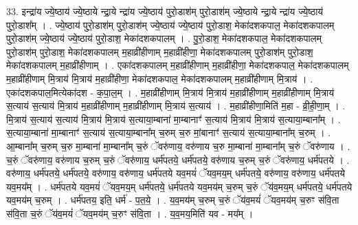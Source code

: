 \documentclass[17pt]{extarticle}
\begin{document}
33. इन्द्रा॑य ज्ये॒ष्ठाय॑ ज्ये॒ष्ठाये न्द्रा॒ये न्द्रा॑य ज्ये॒ष्ठाय॑ पुरो॒डाश॑म् पुरो॒डाश॑म् ज्ये॒ष्ठाये न्द्रा॒ये न्द्रा॑य ज्ये॒ष्ठाय॑ पुरो॒डाश᳚म् । . ज्ये॒ष्ठाय॑ पुरो॒डाश॑म् पुरो॒डाश॑म् ज्ये॒ष्ठाय॑ ज्ये॒ष्ठाय॑ पुरो॒डाश॒ मेका॑दशकपाल॒ मेका॑दशकपालम् पुरो॒डाश॑म् ज्ये॒ष्ठाय॑ ज्ये॒ष्ठाय॑ पुरो॒डाश॒ मेका॑दशकपालम् । . पु॒रो॒डाश॒ मेका॑दशकपाल॒ मेका॑दशकपालम् पुरो॒डाश॑म् पुरो॒डाश॒ मेका॑दशकपालम् म॒हाव्री॑हीणाम् म॒हाव्री॑हीणा॒ मेका॑दशकपालम् पुरो॒डाश॑म् पुरो॒डाश॒ मेका॑दशकपालम् म॒हाव्री॑हीणाम् । . एका॑दशकपालम् म॒हाव्री॑हीणाम् म॒हाव्री॑हीणा॒ मेका॑दशकपाल॒ मेका॑दशकपालम् म॒हाव्री॑हीणाम् मि॒त्राय॑ मि॒त्राय॑ म॒हाव्री॑हीणा॒ मेका॑दशकपाल॒ मेका॑दशकपालम् म॒हाव्री॑हीणाम् मि॒त्राय॑ । . एका॑दशकपाल॒मित्येका॑दश - क॒पा॒ल॒म् । . म॒हाव्री॑हीणाम् मि॒त्राय॑ मि॒त्राय॑ म॒हाव्री॑हीणाम् म॒हाव्री॑हीणाम् मि॒त्राय॑ स॒त्याय॑ स॒त्याय॑ मि॒त्राय॑ म॒हाव्री॑हीणाम् म॒हाव्री॑हीणाम् मि॒त्राय॑ स॒त्याय॑ । . म॒हाव्री॑हीणा॒मिति॑ म॒हा - व्री॒ही॒णा॒म् । . मि॒त्राय॑ स॒त्याय॑ स॒त्याय॑ मि॒त्राय॑ मि॒त्राय॑ स॒त्याया॒म्बाना॑ मा॒म्बानाꣳ॑ स॒त्याय॑ मि॒त्राय॑ मि॒त्राय॑ स॒त्याया॒म्बाना᳚म् । . स॒त्याया॒म्बाना॑ मा॒म्बानाꣳ॑ स॒त्याय॑ स॒त्याया॒म्बाना᳚म् च॒रुम् च॒रु मां॒बानाꣳ॑ स॒त्याय॑ स॒त्याया॒म्बाना᳚म् च॒रुम् । . आ॒म्बाना᳚म् च॒रुम् च॒रु मा॒म्बाना॑ मा॒म्बाना᳚म् च॒रुं ॅवरु॑णाय॒ वरु॑णाय च॒रु मा॒म्बाना॑ मा॒म्बाना᳚म् च॒रुं ॅवरु॑णाय । . च॒रुं ॅवरु॑णाय॒ वरु॑णाय च॒रुम् च॒रुं ॅवरु॑णाय॒ धर्म॑पतये॒ धर्म॑पतये॒ वरु॑णाय च॒रुम् च॒रुं ॅवरु॑णाय॒ धर्म॑पतये । . वरु॑णाय॒ धर्म॑पतये॒ धर्म॑पतये॒ वरु॑णाय॒ वरु॑णाय॒ धर्म॑पतये यव॒मयं॑ ॅयव॒मय॒म् धर्म॑पतये॒ वरु॑णाय॒ वरु॑णाय॒ धर्म॑पतये यव॒मय᳚म् । . धर्म॑पतये यव॒मयं॑ ॅयव॒मय॒म् धर्म॑पतये॒ धर्म॑पतये यव॒मय॑म् च॒रुम् च॒रुं ॅय॑व॒मय॒म् धर्म॑पतये॒ धर्म॑पतये यव॒मय॑म् च॒रुम् । . धर्म॑पतय॒ इति॒ धर्म॑ - प॒त॒ये॒ । . य॒व॒मय॑म् च॒रुम् च॒रुं ॅय॑व॒मयं॑ ॅयव॒मय॑म् च॒रुꣳ स॑वि॒ता स॑वि॒ता च॒रुं ॅय॑व॒मयं॑ ॅयव॒मय॑म् च॒रुꣳ स॑वि॒ता । . य॒व॒मय॒मिति॑ यव - मय᳚म् । \newline
\end{document}
